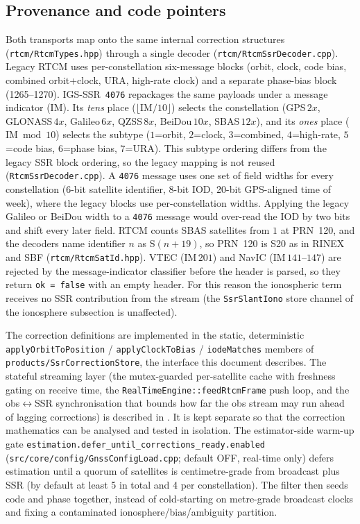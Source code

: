 \documentclass[main.tex]{subfiles}
\begin{document}
\subsection{Provenance and code pointers}\label{sec:ssr-plumbing}

Both transports map onto the same internal correction structures
(\texttt{rtcm/RtcmTypes.hpp}) through a single decoder
(\texttt{rtcm/RtcmSsrDecoder.cpp}). Legacy RTCM uses per-constellation
six-message blocks (orbit, clock, code bias, combined orbit+clock, URA,
high-rate clock) and a separate phase-bias block (1265--1270).
IGS-SSR~\texttt{4076} repackages the same payloads under a
message indicator (IM). Its \emph{tens} place ($\lfloor\mathrm{IM}/10
\rfloor$) selects the constellation (GPS\,$2x$, GLONASS\,$4x$,
Galileo\,$6x$, QZSS\,$8x$, BeiDou\,$10x$, SBAS\,$12x$), and its
\emph{ones} place ($\mathrm{IM}\bmod 10$) selects the subtype
($1$=orbit, $2$=clock, $3$=combined, $4$=high-rate, $5$=code bias,
$6$=phase bias, $7$=URA). This subtype ordering differs from the legacy
SSR block ordering, so the legacy mapping is not reused
(\texttt{RtcmSsrDecoder.cpp}). A \texttt{4076} message uses one set of field
widths for every constellation (6-bit satellite identifier, 8-bit IOD, 20-bit
GPS-aligned time of week), where the legacy blocks use per-constellation
widths. Applying the legacy Galileo or BeiDou width to a \texttt{4076} message
would over-read the IOD by two bits and shift every later field. RTCM counts
SBAS satellites from $1$ at PRN~120, and the decoders name identifier $n$ as
S$(n+19)$, so PRN~120 is S20 as in RINEX and SBF
(\texttt{rtcm/RtcmSatId.hpp}). VTEC (IM\,$201$) and
NavIC (IM\,$141$--$147$) are rejected by the message-indicator
classifier before the header is parsed, so they return
\texttt{ok = false} with an empty header. For this reason the ionospheric
term receives no SSR contribution from the stream (the
\texttt{SsrSlantIono} store channel of the ionosphere subsection is
unaffected).

The correction definitions
 are implemented in the
static, deterministic \texttt{applyOrbitToPosition} / \texttt{applyClockToBias} /
\texttt{iodeMatches} members of \texttt{products/SsrCorrectionStore}, the
interface this document describes. The stateful streaming layer
(the mutex-guarded per-satellite cache with freshness gating on receive
time, the \texttt{RealTimeEngine::feedRtcmFrame} push loop, and the
obs$\leftrightarrow$SSR synchronisation that bounds how far the obs
stream may run ahead of lagging corrections) is described in
. It is kept separate so that
the correction mathematics can be analysed and tested in isolation. The
estimator-side warm-up gate
\texttt{estimation.defer\_until\_corrections\_ready.enabled}
(\texttt{src/core/config/GnssConfigLoad.cpp}; default OFF, real-time only) defers
estimation until a quorum of satellites is centimetre-grade from broadcast
plus SSR (by default at least 5 in total and 4 per constellation). The
filter then seeds code and phase together, instead of cold-starting on
metre-grade broadcast clocks and fixing a contaminated
ionosphere/bias/ambiguity partition.
\end{document}
